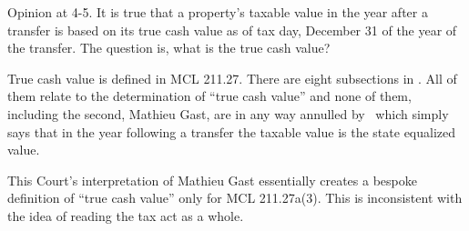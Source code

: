 \documentclass[12pt,\documentclassflag]{michiganCourtOfAppealsBrief}
\begin{document}
Opinion at 4-5. It is true that a property's taxable value in the year after a transfer is based on its true cash value as of tax day, December 31 of the year of the transfer. The question is, what is the true cash value?

True cash value is defined in MCL 211.27. 
There are eight subsections in \cite{MCL 211.27}. All of them relate to the determination of ``true cash value'' and none of them, including the second, Mathieu Gast, are in any way annulled by \cite{MCL 211.27a(2)}\ which simply says that in the year following a transfer the taxable value is the state equalized value.

This Court's interpretation of Mathieu Gast essentially creates a bespoke definition of ``true cash value'' only for MCL 211.27a(3). This is inconsistent with the idea of reading the tax act as a whole. 

\end{document}
